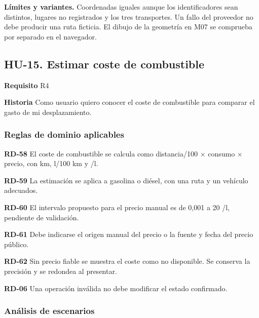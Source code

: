 {\fontsize{9}{11.8}\selectfont\textbf{Límites y variantes.} Coordenadas iguales aunque los identificadores sean distintos, lugares no registrados y los tres transportes. Un fallo del proveedor no debe producir una ruta ficticia. El dibujo de la geometría en M07 se comprueba por separado en el navegador.\par}\vspace{4pt}
\clearpage\subsection*{HU-15. Estimar coste de combustible}

\textbf{Requisito} R4\par

\textbf{Historia} Como usuario quiero conocer el coste de combustible para comparar el gasto de mi desplazamiento.\par

\subsubsection*{Reglas de dominio aplicables}

\textbf{RD-58} El coste de combustible se calcula como distancia/100 \(\times\) consumo \(\times\) precio, con km, l/100 km y \texteuro{}/l.\par

\textbf{RD-59} La estimación se aplica a gasolina o diésel, con una ruta y un vehículo adecuados.\par

\textbf{RD-60} El intervalo propuesto para el precio manual es de 0,001 a 20 \texteuro{}/l, pendiente de validación.\par

\textbf{RD-61} Debe indicarse el origen manual del precio o la fuente y fecha del precio público.\par

\textbf{RD-62} Sin precio fiable se muestra el coste como no disponible. Se conserva la precisión y se redondea al presentar.\par

\textbf{RD-06} Una operación inválida no debe modificar el estado confirmado.\par

\subsubsection*{Análisis de escenarios}

